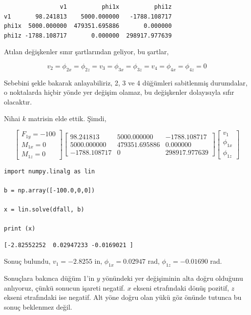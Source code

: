 \documentclass[12pt,fleqn]{article}\usepackage{../../common}
\begin{document}
\begin{verbatim}
                v1          phi1x          phi1z
v1       98.241813    5000.000000   -1788.108717
phi1x  5000.000000  479351.695886       0.000000
phi1z -1788.108717       0.000000  298917.977639
\end{verbatim}

Atılan değişkenler sınır şartlarından geliyor, bu şartlar,

$$
v_2 = \phi_{2x} = \phi_{2z} = v_3 = \phi_{3x} = \phi_{3z} = v_4 = \phi_{4x} = \phi_{4z} = 0
$$

Sebebini şekle bakarak anlayabiliriz, 2, 3 ve 4 düğümleri sabitlenmiş
durumdalar, o noktalarda hiçbir yönde yer değişim olamaz, bu değişkenler
dolayısıyla sıfır olacaktır.

Nihai $k$ matrisin elde ettik. Şimdi,

$$
\left[\begin{array}{c}
F_{1y} = -100 \\ M_{1x} = 0 \\ M_{1z} = 0
\end{array}\right]
\left[\begin{array}{ccc}
   98.241813 &   5000.000000 &   -1788.108717 \\
 5000.000000 &  479351.695886 &       0.000000 \\
-1788.108717  &      0 &  298917.977639
\end{array}\right]
\left[\begin{array}{c}
v_1 \\ \phi_{1x} \\ \phi_{1z}
\end{array}\right]
$$

\begin{verbatim}
import numpy.linalg as lin

b = np.array([-100.0,0,0])

x = lin.solve(dfall, b)

print (x)
\end{verbatim}

\begin{verbatim}
[-2.82552252  0.02947233 -0.0169021 ]
\end{verbatim}

Sonuç bulundu, $v_1 = -2.8255$ in, $\phi_{1x} = 0.02947$ rad, $\phi_{1z} =
-0.01690$ rad.

Sonuçlara bakınca düğüm 1'in $y$ yönündeki yer değişiminin alta doğru olduğunu
anlıyoruz, çünkü sonucun işareti negatif. $x$ ekseni etrafındaki dönüş pozitif,
$z$ ekseni etrafındaki ise negatif. Alt yöne doğru olan yükü göz önünde tutunca
bu sonuç beklenmez değil.
\end{document}
